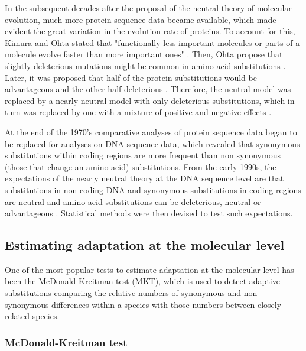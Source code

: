 In the subsequent decades after the proposal of the neutral theory of molecular evolution, much more protein sequence data became available, which made evident the great variation in the evolution rate of proteins.
To account for this, Kimura and Ohta stated that "functionally less important molecules or parts of a molecule evolve faster than more important ones" \citep{Kimura1974}.
Then, Ohta propose that slightly deleterious mutations might be common in amino acid substitutions \citep{Ohta1973}. Later, it was proposed that half of the protein substitutions would be advantageous and the other half deleterious \citep{gillespie1994causes}.
Therefore, the neutral model was replaced by a nearly neutral model with only deleterious substitutions, which in turn was replaced by one with a mixture of positive and negative effects \citep{Ohta1996}.

At the end of the 1970's comparative analyses of protein sequence data began to be replaced for analyses on DNA sequence data, which revealed that synonymous substitutions within coding regions are more frequent than non synonymous (those that change an amino acid) substitutions.
%
From the early 1990s, the expectations of the nearly neutral theory at the DNA sequence level are that substitutions in non coding DNA and synonymous substitutions in coding regions are neutral and amino acid substitutions can be deleterious, neutral or advantageous \citep{Ohta1996}. Statistical methods were then devised to test such expectations.

\subsection{Estimating adaptation at the molecular level}
One of the most popular tests to estimate adaptation at the molecular level has been the McDonald-Kreitman test (MKT), which is used to detect adaptive substitutions comparing the relative numbers of synonymous and non-synonymous differences within a species with those numbers between closely related species.

\subsubsection{McDonald-Kreitman test}


